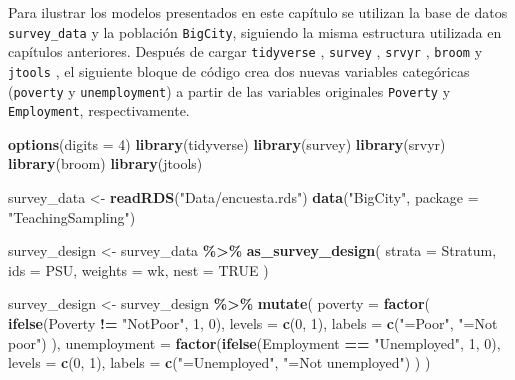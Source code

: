 \documentclass[
  spanish,
  12pt,
]{book}
\newenvironment{Shaded}{\begin{snugshade}}{\end{snugshade}}
\newcommand{\AttributeTok}[1]{\textcolor[rgb]{0.13,0.29,0.53}{#1}}
\newcommand{\ConstantTok}[1]{\textcolor[rgb]{0.56,0.35,0.01}{#1}}
\newcommand{\DecValTok}[1]{\textcolor[rgb]{0.00,0.00,0.81}{#1}}
\newcommand{\FunctionTok}[1]{\textcolor[rgb]{0.13,0.29,0.53}{\textbf{#1}}}
\newcommand{\NormalTok}[1]{#1}
\newcommand{\OtherTok}[1]{\textcolor[rgb]{0.56,0.35,0.01}{#1}}
\newcommand{\SpecialCharTok}[1]{\textcolor[rgb]{0.81,0.36,0.00}{\textbf{#1}}}
\newcommand{\StringTok}[1]{\textcolor[rgb]{0.31,0.60,0.02}{#1}}
\begin{document}
Para ilustrar los modelos presentados en este capítulo se utilizan la base de datos \texttt{survey\_data} y la población \texttt{BigCity}, siguiendo la misma estructura utilizada en capítulos anteriores. Después de cargar \texttt{tidyverse} \citep{tidyverse2026}, \texttt{survey} \citep{Lumley2024}, \texttt{srvyr} \citep{Freedman2024}, \texttt{broom} \citep{broom2026} y \texttt{jtools} \citep{jtools2026}, el siguiente bloque de código crea dos nuevas variables categóricas (\texttt{poverty} y \texttt{unemployment}) a partir de las variables originales \texttt{Poverty} y \texttt{Employment}, respectivamente.

\begin{Shaded}
\begin{Highlighting}[]
\FunctionTok{options}\NormalTok{(}\AttributeTok{digits =} \DecValTok{4}\NormalTok{)}
\FunctionTok{library}\NormalTok{(tidyverse)}
\FunctionTok{library}\NormalTok{(survey)}
\FunctionTok{library}\NormalTok{(srvyr)}
\FunctionTok{library}\NormalTok{(broom)}
\FunctionTok{library}\NormalTok{(jtools)}

\NormalTok{survey\_data }\OtherTok{\textless{}{-}} \FunctionTok{readRDS}\NormalTok{(}\StringTok{"Data/encuesta.rds"}\NormalTok{)}
\FunctionTok{data}\NormalTok{(}\StringTok{"BigCity"}\NormalTok{, }\AttributeTok{package =} \StringTok{"TeachingSampling"}\NormalTok{)}

\NormalTok{survey\_design }\OtherTok{\textless{}{-}}\NormalTok{ survey\_data }\SpecialCharTok{\%\textgreater{}\%}
  \FunctionTok{as\_survey\_design}\NormalTok{(}
    \AttributeTok{strata =}\NormalTok{ Stratum,}
    \AttributeTok{ids =}\NormalTok{ PSU,}
    \AttributeTok{weights =}\NormalTok{ wk,}
    \AttributeTok{nest =} \ConstantTok{TRUE}
\NormalTok{  )}

\NormalTok{survey\_design }\OtherTok{\textless{}{-}}\NormalTok{ survey\_design }\SpecialCharTok{\%\textgreater{}\%}
  \FunctionTok{mutate}\NormalTok{(}
    \AttributeTok{poverty =} \FunctionTok{factor}\NormalTok{(}
      \FunctionTok{ifelse}\NormalTok{(Poverty }\SpecialCharTok{!=} \StringTok{"NotPoor"}\NormalTok{, }\DecValTok{1}\NormalTok{, }\DecValTok{0}\NormalTok{),}
      \AttributeTok{levels =} \FunctionTok{c}\NormalTok{(}\DecValTok{0}\NormalTok{, }\DecValTok{1}\NormalTok{),}
      \AttributeTok{labels =} \FunctionTok{c}\NormalTok{(}\StringTok{"=Poor"}\NormalTok{, }\StringTok{"=Not poor"}\NormalTok{)}
\NormalTok{    ),}
    \AttributeTok{unemployment =} \FunctionTok{factor}\NormalTok{(}\FunctionTok{ifelse}\NormalTok{(Employment }\SpecialCharTok{==} \StringTok{"Unemployed"}\NormalTok{, }\DecValTok{1}\NormalTok{, }\DecValTok{0}\NormalTok{),}
      \AttributeTok{levels =} \FunctionTok{c}\NormalTok{(}\DecValTok{0}\NormalTok{, }\DecValTok{1}\NormalTok{),}
      \AttributeTok{labels =} \FunctionTok{c}\NormalTok{(}\StringTok{"=Unemployed"}\NormalTok{, }\StringTok{"=Not unemployed"}\NormalTok{)}
\NormalTok{    )}
\NormalTok{  )}
\end{Highlighting}
\end{Shaded}
\end{document}
